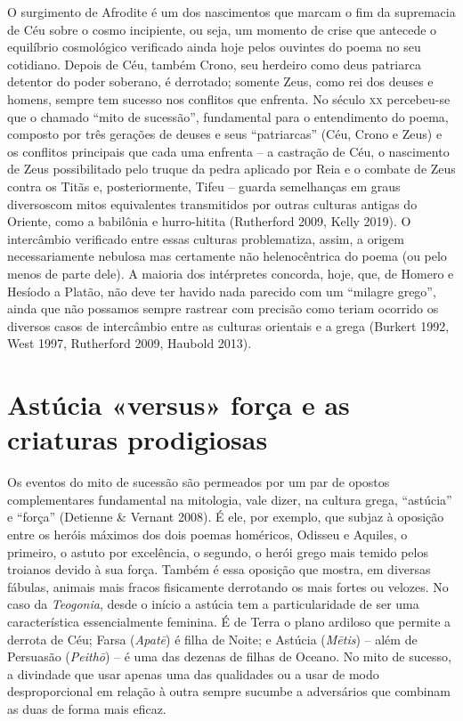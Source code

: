 O surgimento de Afrodite é um dos nascimentos que marcam o fim da
supremacia de Céu sobre o cosmo incipiente, ou seja, um momento de crise
que antecede o equilíbrio cosmológico verificado ainda hoje pelos
ouvintes do poema no seu cotidiano. Depois de Céu, também Crono, seu
herdeiro como deus patriarca detentor do poder soberano, é derrotado;
somente Zeus, como rei dos deuses e homens, sempre tem sucesso nos
conflitos que enfrenta. No século \textsc{xx} percebeu-se que o chamado ``mito de
sucessão'', fundamental para o entendimento do poema, composto por três
gerações de deuses e seus ``patriarcas'' (Céu, Crono e Zeus) e os
conflitos principais que cada uma enfrenta -- a castração de Céu, o
nascimento de Zeus possibilitado pelo truque da pedra aplicado por Reia
e o combate de Zeus contra os Titãs e, posteriormente, Tifeu -- guarda
semelhanças em graus diversoscom mitos equivalentes transmitidos por
outras culturas antigas do Oriente, como a babilônia e hurro-hitita
(Rutherford 2009, Kelly 2019). O intercâmbio verificado entre essas
culturas problematiza, assim, a origem necessariamente nebulosa mas
certamente não helenocêntrica do poema (ou pelo menos de parte dele). A
maioria dos intérpretes concorda, hoje, que, de Homero e Hesíodo a
Platão, não deve ter havido nada parecido com um ``milagre grego'',
ainda que não possamos sempre rastrear com precisão como teriam ocorrido
os diversos casos de intercâmbio entre as culturas orientais e a grega
(Burkert 1992, West 1997, Rutherford 2009, Haubold 2013).

\section{Astúcia «versus» força e as criaturas prodigiosas}

Os eventos do mito de sucessão são permeados por um par de opostos
complementares fundamental na mitologia, vale dizer, na cultura grega,
``astúcia'' e ``força'' (Detienne \& Vernant 2008). É ele, por exemplo,
que subjaz à oposição entre os heróis máximos dos dois poemas homéricos,
Odisseu e Aquiles, o primeiro, o astuto por excelência, o segundo, o
herói grego mais temido pelos troianos devido à sua força. Também é essa
oposição que mostra, em diversas fábulas, animais mais fracos
fisicamente derrotando os mais fortes ou velozes. No caso da
\emph{Teogonia}, desde o início a astúcia tem a particularidade de ser
uma característica essencialmente feminina. É de Terra o plano ardiloso
que permite a derrota de Céu; Farsa (\emph{Apatē}) é filha de Noite; e
Astúcia (\emph{Mētis}) -- além de Persuasão (\emph{Peithō}) -- é uma das
dezenas de filhas de Oceano. No mito de sucesso, a divindade que usar
apenas uma das qualidades ou a usar de modo desproporcional em relação à
outra sempre sucumbe a adversários que combinam as duas de forma mais
eficaz.

